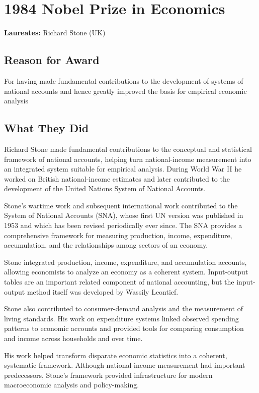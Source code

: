 \chapter{1984 Nobel Prize in Economics}
\textbf{Laureates: }Richard Stone (UK)

\section*{Reason for Award}
For having made fundamental contributions to the development of systems of
national accounts and hence greatly improved the basis for empirical economic analysis

\section{What They Did}
Richard Stone made fundamental contributions to the conceptual and statistical
framework of national accounts, helping turn national-income measurement into
an integrated system suitable for empirical analysis. During World War II he
worked on British national-income estimates and later contributed to the
development of the United Nations System of National Accounts.

Stone's wartime work and subsequent international work contributed to the
System of National Accounts (SNA), whose first UN version was published in
1953 and which has been revised periodically ever since. The SNA provides a
comprehensive framework for measuring production, income, expenditure,
accumulation, and the relationships among sectors of an economy.

Stone integrated production, income, expenditure, and accumulation accounts,
allowing economists to analyze an economy as a coherent system. Input-output
tables are an important related component of national accounting, but the
input-output method itself was developed by Wassily Leontief.

Stone also contributed to consumer-demand analysis and the measurement of
living standards. His work on expenditure systems linked observed spending
patterns to economic accounts and provided tools for comparing consumption and
income across households and over time.

His work helped transform disparate economic statistics into a coherent,
systematic framework. Although national-income measurement had important
predecessors, Stone's framework provided infrastructure for modern
macroeconomic analysis and policy-making.


